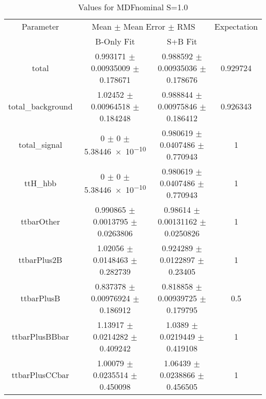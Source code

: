 \begin{table}
\centering
\caption{Values for MDFnominal S=1.0}
\begin{tabular}{cccc}
\toprule
Parameter & \multicolumn{2}{c}{Mean $\pm$ Mean Error $\pm$ RMS} & Expectation\\
 & B-Only Fit & S+B Fit & \\
\midrule
total & \num{0.993171} $\pm$ \num{0.00935009} $\pm$ \num{0.178671} & \num{0.988592} $\pm$ \num{0.00935036} $\pm$ \num{0.178676} & \num{0.929724}\\
total\_background & \num{1.02452} $\pm$ \num{0.00964518} $\pm$ \num{0.184248} & \num{0.988844} $\pm$ \num{0.00975846} $\pm$ \num{0.186412} & \num{0.926343}\\
total\_signal & \num{0} $\pm$ \num{0} $\pm$ \num{5.38446e-10} & \num{0.980619} $\pm$ \num{0.0407486} $\pm$ \num{0.770943} & \num{1}\\
ttH\_hbb & \num{0} $\pm$ \num{0} $\pm$ \num{5.38446e-10} & \num{0.980619} $\pm$ \num{0.0407486} $\pm$ \num{0.770943} & \num{1}\\
ttbarOther & \num{0.990865} $\pm$ \num{0.0013795} $\pm$ \num{0.0263806} & \num{0.98614} $\pm$ \num{0.00131162} $\pm$ \num{0.0250826} & \num{1}\\
ttbarPlus2B & \num{1.02056} $\pm$ \num{0.0148463} $\pm$ \num{0.282739} & \num{0.924289} $\pm$ \num{0.0122897} $\pm$ \num{0.23405} & \num{1}\\
ttbarPlusB & \num{0.837378} $\pm$ \num{0.00976924} $\pm$ \num{0.186912} & \num{0.818858} $\pm$ \num{0.00939725} $\pm$ \num{0.179795} & \num{0.5}\\
ttbarPlusBBbar & \num{1.13917} $\pm$ \num{0.0214282} $\pm$ \num{0.409242} & \num{1.0389} $\pm$ \num{0.0219449} $\pm$ \num{0.419108} & \num{1}\\
ttbarPlusCCbar & \num{1.00079} $\pm$ \num{0.0235514} $\pm$ \num{0.450098} & \num{1.06439} $\pm$ \num{0.0238866} $\pm$ \num{0.456505} & \num{1}\\
\bottomrule
\end{tabular}
\end{table}